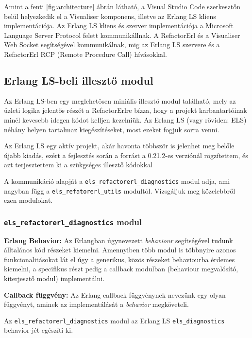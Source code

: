 Amint a fenti \ref{fig:architecture} ábrán látható, a Visual Studio Code szerkesztőn belül helyezkedik el a Visualiser komponens, illetve az Erlang LS kliens implementációja. Az Erlang LS kliens és szerver implementációja a Microsoft Language Server Protocol \cite{microsoftLSp} felett kommunikállnak. A RefactorErl és a Visualiser Web Socket segítségével kommunikálnak, mig az Erlang LS szervere és a RefactorErl RCP (Remote Procedure Call) hívásokkal.

\subsection{Erlang LS-beli illesztő modul}
Az Erlang LS-ben egy meglehetősen miniális illesztő modul található, mely az üzleti logika jelentős részét a RefactorErlre bízza, hogy a projekt karbantartóinak minél kevesebb idegen kódot kelljen kezelniük. Az Erlang LS (vagy röviden: ELS) néhány helyen tartalmaz kiegészítéseket, most ezeket fogjuk sorra venni.

Az Erlang LS egy aktív projekt, akár havonta többször is jelenhet meg belőle újabb kiadás, ezért a fejlesztés során a forrást a 0.21.2-es verziónál rögzítettem, és azt terjesztettem ki a szükgséges illesztő kódokkal

A kommunikáció alapját a \lstinline{els_refactorerl_diagnostics} modul adja, ami nagyban függ a \lstinline{els_refatorerl_utils} modultól. Vizsgáljuk meg közelebbről ezen modulokat.

\subsubsection{\lstinline{els_refactorerl_diagnostics} modul}

\textbf{Erlang Behavior:} Az Erlangban úgynevezett \textit{behaviour} segítségével tudunk álltalános kód részeket kiemelni. Amennyiben több modul is többnyire azonos funkcionalitásokat lát el úgy a generikus, közös részeket behaviourba érdemes kiemelni, a specifikus részt pedig a callback modulban (behaviour megvalósító, kiterjesztő modul) implementálni.

\textbf{Callback függvény:} Az Erlang callback függvénynek nevezünk egy olyan függvényt, aminek az implementálását a \textit{behavior} megköveteli.


Az \lstinline{els_refactorerl_diagnostics} modul az Erlang LS \lstinline{els_diagnostics} behavior-jét egészíti ki. 

